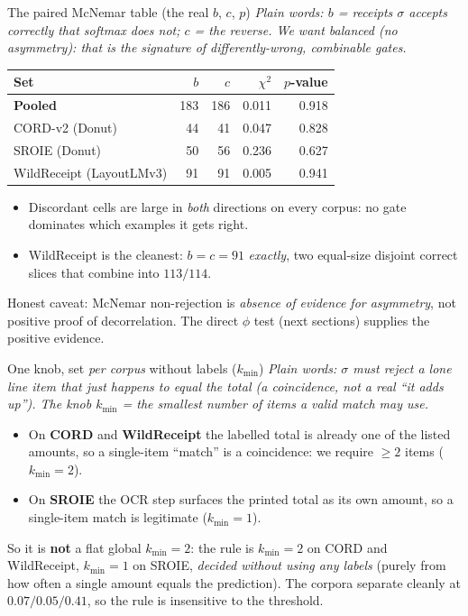 \documentclass[aspectratio=169]{beamer}
\newcommand{\poolMcB}{183}
\newcommand{\poolMcC}{186}
\newcommand{\poolMcChi}{0.011}
\newcommand{\poolMcP}{0.918}
\newcommand{\keybox}[1]{\begin{center}\colorbox{grey!15}{\parbox{0.92\linewidth}{\centering #1}}\end{center}}
\newcommand{\plain}[1]{\textit{\textcolor{sig}{Plain words:} #1}}
\begin{document}
\begin{frame}{The paired McNemar table (the real $b$, $c$, $p$)}
\plain{$b$ = receipts $\sigma$ accepts correctly that softmax does
not; $c$ = the reverse. We want \emph{balanced} (no asymmetry):
that is the signature of differently-wrong, combinable gates.}
\vspace{0.3em}
\begin{center}\small
\begin{tabular}{lrrrr}
\hline
Set & $b$ & $c$ & $\chi^2$ & $p$-value \\
\hline
\textbf{Pooled} & \poolMcB & \poolMcC & \poolMcChi & \poolMcP \\
CORD-v2 (Donut) & 44 & 41 & 0.047 & 0.828 \\
SROIE (Donut) & 50 & 56 & 0.236 & 0.627 \\
WildReceipt (LayoutLMv3) & 91 & 91 & 0.005 & 0.941 \\
\hline
\end{tabular}
\end{center}
\vspace{0.3em}
\begin{itemize}
\item Discordant cells are large in \emph{both} directions on every
corpus: no gate dominates which examples it gets right.
\item WildReceipt is the cleanest: $b{=}c{=}91$ \emph{exactly},
two equal-size disjoint correct slices that combine into $113/114$.
\end{itemize}
\keybox{Honest caveat: McNemar non-rejection is \emph{absence of
evidence for asymmetry}, not positive proof of decorrelation. The
direct $\phi$ test (next sections) supplies the positive evidence.}
\end{frame}

\begin{frame}{One knob, set \emph{per corpus} without labels ($k_{\min}$)}
\plain{$\sigma$ must reject a lone line item that just happens to
equal the total (a coincidence, not a real ``it adds up''). The knob
$k_{\min}$ = the smallest number of items a valid match may use.}
\begin{itemize}
\item On \textbf{CORD} and \textbf{WildReceipt} the labelled total is
already one of the listed amounts, so a single-item ``match'' is a
coincidence: we require $\ge 2$ items ($k_{\min}{=}2$).
\item On \textbf{SROIE} the OCR step surfaces the printed total as its
own amount, so a single-item match is legitimate ($k_{\min}{=}1$).
\end{itemize}
\keybox{So it is \textbf{not} a flat global $k_{\min}{=}2$: the rule is
$k_{\min}{=}2$ on CORD and WildReceipt, $k_{\min}{=}1$ on SROIE,
\emph{decided without using any labels} (purely from how often a single
amount equals the prediction). The corpora separate cleanly at
$0.07/0.05/0.41$, so the rule is insensitive to the threshold.}
\end{frame}
\end{document}
